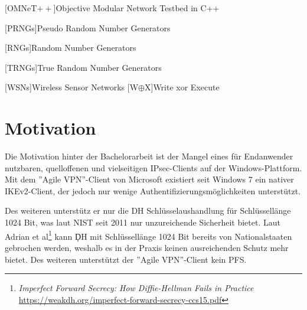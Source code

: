 \documentclass[a4paper]{article}
\begin{document}
\begin{acronym}
    [OMNeT$++$]{Objective Modular Network Testbed in C++}

    [PRNGs]{Pseudo Random Number Generators}

    
    [RNGs]{Random Number Generators}



    
    


    [TRNGs]{True Random Number Generators}

	
	
    [WSNs]{Wireless Sensor Networks}
    [W$\oplus$X]{Write xor Execute}

\end{acronym}

\newpage

\thispagestyle{empty}
\section{Motivation}
Die Motivation hinter der Bachelorarbeit ist der Mangel eines für Endanwender 
nutzbaren, quelloffenen und vielseitigen IPsec-Clients auf der Windows-Plattform.
Mit dem ''Agile VPN''-Client von Microsoft existiert seit Windows 7 ein nativer
IKEv2-Client, der jedoch nur wenige Authentifizierungsmöglichkeiten unterstützt.

Des weiteren unterstütz er nur die \ac{DH} Schlüsselaushandlung für
Schlüssellänge 1024 Bit, was laut NIST seit 2011 nur unzureichende Sicherheit bietet.
Laut Adrian et al\footnote{\textit{Imperfect Forward Secrecy: How Diffie-Hellman Fails in Practice} \url{https://weakdh.org/imperfect-forward-secrecy-ccs15.pdf}}
kann \c{DH} mit Schlüssellänge 1024 Bit bereits von Nationalstaaten gebrochen werden,
weshalb es in der Praxis keinen ausreichenden Schutz mehr bietet. 
Des weiteren unterstützt der ''Agile VPN''-Client kein \ac{PFS}.
\end{document}
